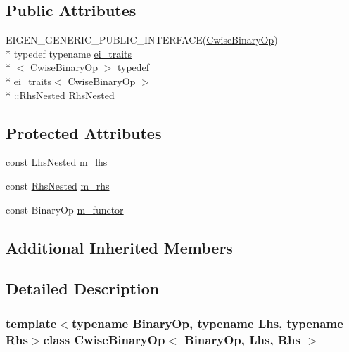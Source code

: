 \subsection*{Public Attributes}
\begin{DoxyCompactItemize}
\item 
E\-I\-G\-E\-N\-\_\-\-G\-E\-N\-E\-R\-I\-C\-\_\-\-P\-U\-B\-L\-I\-C\-\_\-\-I\-N\-T\-E\-R\-F\-A\-C\-E(\hyperlink{class_cwise_binary_op}{Cwise\-Binary\-Op}) \\*
typedef typename \hyperlink{structei__traits}{ei\-\_\-traits}\\*
$<$ \hyperlink{class_cwise_binary_op}{Cwise\-Binary\-Op} $>$ typedef \\*
\hyperlink{structei__traits}{ei\-\_\-traits}$<$ \hyperlink{class_cwise_binary_op}{Cwise\-Binary\-Op} $>$\\*
\-::Rhs\-Nested \hyperlink{class_cwise_binary_op_a02c37ce812dcda7dac764ed8c84b9934}{Rhs\-Nested}
\end{DoxyCompactItemize}
\subsection*{Protected Attributes}
\begin{DoxyCompactItemize}
\item 
const Lhs\-Nested \hyperlink{class_cwise_binary_op_a7b21cd7da7a0fdb934cbb826aa2ad166}{m\-\_\-lhs}
\item 
const \hyperlink{class_cwise_binary_op_a02c37ce812dcda7dac764ed8c84b9934}{Rhs\-Nested} \hyperlink{class_cwise_binary_op_ab659ca98c44f9f6c6b7dea8f481701a8}{m\-\_\-rhs}
\item 
const Binary\-Op \hyperlink{class_cwise_binary_op_af0de993d1994d7a498f832e1798d8925}{m\-\_\-functor}
\end{DoxyCompactItemize}
\subsection*{Additional Inherited Members}


\subsection{Detailed Description}
\subsubsection*{template$<$typename Binary\-Op, typename Lhs, typename Rhs$>$class Cwise\-Binary\-Op$<$ Binary\-Op, Lhs, Rhs $>$}

